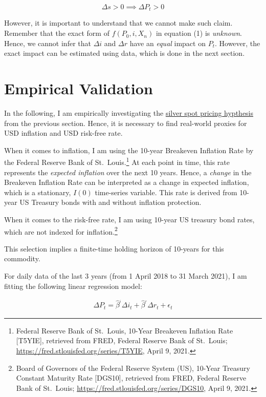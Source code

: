 \documentclass[
  12pt,
]{article}
\begin{document}
\[\Delta s >0 \implies \Delta P_t > 0\]

However, it is important to understand that we cannot make such claim.
Remember that the exact form of \(f(P_0, i, X_n)\) in equation (1) is
\emph{unknown}. Hence, we cannot infer that \(\Delta i\) and
\(\Delta r\) have an \emph{equal} impact on \(P_t\). However, the exact
impact can be estimated using data, which is done in the next section.

\newpage

\hypertarget{empirical-validation}{%
\section{Empirical Validation}\label{empirical-validation}}

In the following, I am empirically investigating the
\protect\hyperlink{silver-spot-pricing-hypothesis}{silver spot pricing
hypthesis} from the previous section. Hence, it is necessary to find
real-world proxies for USD inflation and USD risk-free rate.

When it comes to inflation, I am using the 10-year Breakeven Inflation
Rate by the Federal Reserve Bank of St.~Louis.\footnote{Federal Reserve
  Bank of St.~Louis, 10-Year Breakeven Inflation Rate {[}T5YIE{]},
  retrieved from FRED, Federal Reserve Bank of St.~Louis;
  \url{https://fred.stlouisfed.org/series/T5YIE}, April 9, 2021.} At
each point in time, this rate represents the \emph{expected inflation}
over the next 10 years. Hence, a \emph{change} in the Breakeven
Inflation Rate can be interpreted as a change in expected inflation,
which is a stationary, \(I(0)\) time-series variable. This rate is
derived from 10-year US Treasury bonds with and without inflation
protection.

When it comes to the risk-free rate, I am using 10-year US treasury bond
rates, which are not indexed for inflation.\footnote{Board of Governors
  of the Federal Reserve System (US), 10-Year Treasury Constant Maturity
  Rate {[}DGS10{]}, retrieved from FRED, Federal Reserve Bank of
  St.~Louis; \url{https://fred.stlouisfed.org/series/DGS10}, April 9,
  2021.}

This selection implies a finite-time holding horizon of 10-years for
this commodity.

For daily data of the last 3 years (from 1 April 2018 to 31 March 2021),
I am fitting the following linear regression model:

\begin{align}
\Delta P_t = \hat\beta^{_i} \Delta i_t + \hat\beta^{_r} \Delta r_t + \epsilon_t
\end{align}
\end{document}

